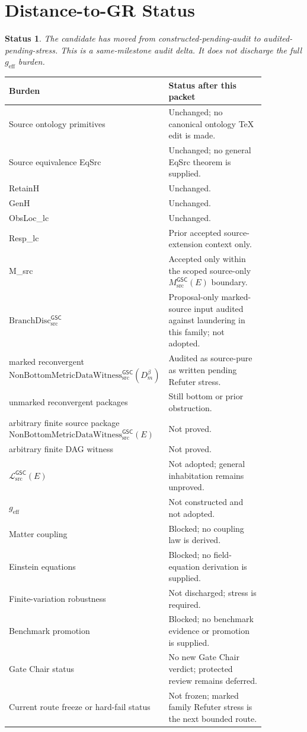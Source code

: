 \documentclass[11pt]{article}
\newcommand{\Witness}{\mathrm{NonBottomMetricDataWitness}_{\mathrm{src}}^{\mathsf{GSC}}}
\newcommand{\MetricData}{\mathcal{L}_{\mathrm{src}}^{\mathsf{GSC}}}
\newcommand{\geff}{g_{\mathrm{eff}}}
\newcommand{\BranchDisc}{\mathrm{BranchDisc}_{\mathrm{src}}^{\mathsf{GSC}}}
\newcommand{\Dmbeta}{D_m^{\beta}}
\newtheorem{status}{Status}
\begin{document}
\section{Distance-to-GR Status}

\begin{status}
The candidate has moved from constructed-pending-audit to
audited-pending-stress. This is a same-milestone audit delta. It does not
discharge the full \(\geff\) burden.
\end{status}

\begin{longtable}{p{0.30\linewidth}p{0.56\linewidth}}
\toprule
Burden & Status after this packet \\
\midrule
Source ontology primitives & Unchanged; no canonical ontology TeX edit is made. \\
Source equivalence EqSrc & Unchanged; no general EqSrc theorem is supplied. \\
RetainH & Unchanged. \\
GenH & Unchanged. \\
ObsLoc\_lc & Unchanged. \\
Resp\_lc & Prior accepted source-extension context only. \\
M\_src & Accepted only within the scoped source-only \(M_{\mathrm{src}}^{\mathsf{GSC}}(E)\) boundary. \\
\(\BranchDisc\) & Proposal-only marked-source input audited against laundering in this family; not adopted. \\
marked reconvergent \(\Witness(\Dmbeta)\) & Audited as source-pure as written pending Refuter stress. \\
unmarked reconvergent packages & Still bottom or prior obstruction. \\
arbitrary finite source package \(\Witness(E)\) & Not proved. \\
arbitrary finite DAG witness & Not proved. \\
\(\MetricData(E)\) & Not adopted; general inhabitation remains unproved. \\
\(\geff\) & Not constructed and not adopted. \\
Matter coupling & Blocked; no coupling law is derived. \\
Einstein equations & Blocked; no field-equation derivation is supplied. \\
Finite-variation robustness & Not discharged; stress is required. \\
Benchmark promotion & Blocked; no benchmark evidence or promotion is supplied. \\
Gate Chair status & No new Gate Chair verdict; protected review remains deferred. \\
Current route freeze or hard-fail status & Not frozen; marked family Refuter stress is the next bounded route. \\
\bottomrule
\end{longtable}
\end{document}
